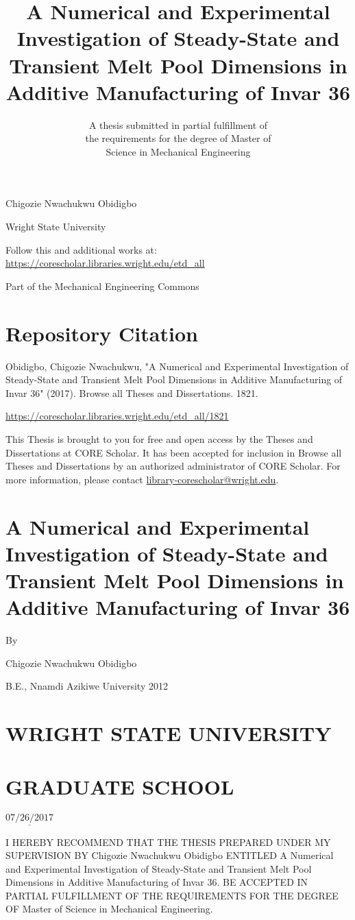 \documentclass[10pt]{article}
\title{A Numerical and Experimental Investigation of Steady-State and Transient Melt Pool Dimensions in Additive Manufacturing of Invar 36 }
\author{A thesis submitted in partial fulfillment of\\
the requirements for the degree of Master of\\
Science in Mechanical Engineering}
\date{}
\begin{document}
\maketitle
Chigozie Nwachukwu Obidigbo

Wright State University

Follow this and additional works at: \href{https://corescholar.libraries.wright.edu/etd_all}{https://corescholar.libraries.wright.edu/etd\_all}

Part of the Mechanical Engineering Commons

\section*{Repository Citation}
Obidigbo, Chigozie Nwachukwu, "A Numerical and Experimental Investigation of Steady-State and Transient Melt Pool Dimensions in Additive Manufacturing of Invar 36" (2017). Browse all Theses and Dissertations. 1821.

\href{https://corescholar.libraries.wright.edu/etd_all/1821}{https://corescholar.libraries.wright.edu/etd\_all/1821}

This Thesis is brought to you for free and open access by the Theses and Dissertations at CORE Scholar. It has been accepted for inclusion in Browse all Theses and Dissertations by an authorized administrator of CORE Scholar. For more information, please contact \href{mailto:library-corescholar@wright.edu}{library-corescholar@wright.edu}.

\section*{A Numerical and Experimental Investigation of Steady-State and Transient Melt Pool Dimensions in Additive Manufacturing of Invar 36 }
By

Chigozie Nwachukwu Obidigbo

B.E., Nnamdi Azikiwe University 2012

\section*{WRIGHT STATE UNIVERSITY}
\section*{GRADUATE SCHOOL}
$\underline{07 / 26 / 2017}$

I HEREBY RECOMMEND THAT THE THESIS PREPARED UNDER MY SUPERVISION BY Chigozie Nwachukwu Obidigbo ENTITLED A Numerical and Experimental Investigation of Steady-State and Transient Melt Pool Dimensions in Additive Manufacturing of Invar 36. BE ACCEPTED IN PARTIAL FULFILLMENT OF THE REQUIREMENTS FOR THE DEGREE OF Master of Science in Mechanical Engineering.
\end{document}
